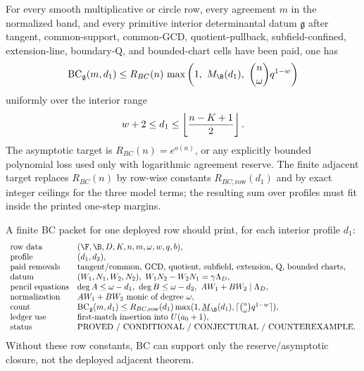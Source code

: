 \begin{conjecture}
\label{conj:gf-bc-exact-census}
For every smooth multiplicative or circle row, every agreement \(m\) in the
normalized band, and every primitive interior determinantal datum
\(\mathfrak g\) after tangent, common-support, common-GCD, quotient-pullback,
subfield-confined, extension-line, boundary-Q, and bounded-chart cells have
been paid, one has
\[
        \mathrm{BC}_{\mathfrak g}(m,d_1)
        \le
        R_{BC}(n)\,
        \max\left(
        1,\ M_{\B}(d_1),\ \binom n\omega q^{1-w}
        \right)
\]
uniformly over the interior range
\[
        w+2\le d_1\le \left\lfloor {n-K+1\over2}\right\rfloor .
\]
The asymptotic target is \(R_{BC}(n)=e^{o(n)}\), or any explicitly bounded
polynomial loss used only with logarithmic agreement reserve.  The finite
adjacent target replaces \(R_{BC}(n)\) by row-wise constants
\(R_{BC,\mathrm{row}}(d_1)\) and by exact integer ceilings for the three model
terms; the resulting sum over profiles must fit inside the printed one-step
margins.
\end{conjecture}

\begin{remark}
\label{rem:gf-bc-finite-packet}
A finite BC packet for one deployed row should print, for each interior
profile \(d_1\):
\[
\begin{array}{ll}
\text{row data} & (\F,\B,D,K,n,m,\omega,w,q,b),\\
\text{profile} & (d_1,d_2),\\
\text{paid removals} &
\text{tangent/common, GCD, quotient, subfield, extension, Q, bounded charts},\\
\text{datum} & (W_1,N_1,W_2,N_2),\
W_1N_2-W_2N_1=\gamma\Lambda_D,\\
\text{pencil equations} & \deg A\le\omega-d_1,\ \deg B\le\omega-d_2,\
AW_1+BW_2\mid\Lambda_D,\\
\text{normalization} & AW_1+BW_2\text{ monic of degree }\omega,\\
\text{count} & \mathrm{BC}_{\mathfrak g}(m,d_1)
\le R_{BC,\mathrm{row}}(d_1)\max(1,\underline M_{\B}(d_1),
\lceil\binom n\omega q^{1-w}\rceil),\\
\text{ledger use} & \text{first-match insertion into }U(a_0+1),\\
\text{status} & \text{PROVED / CONDITIONAL / CONJECTURAL / COUNTEREXAMPLE}.
\end{array}
\]
Without these row constants, BC can support only the reserve/asymptotic closure,
not the deployed adjacent theorem.
\end{remark}

